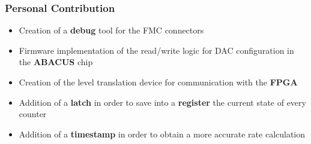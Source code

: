 \documentclass[aspectratio=169]{beamer}
\begin{document}
	
	\begin{frame}
	\frametitle{Personal Contribution}
	\begin{itemize}
		\item {\color{teal} Creation of a \textbf{debug} tool for the FMC connectors}
		\item {\color{teal} Firmware implementation of the read/write logic for DAC configuration in the \textbf{ABACUS} chip}
		\item {\color{teal} Creation of the level translation device for communication with the \textbf{FPGA}}
		\item {\color{red} Addition of a \textbf{latch} in order to save into a \textbf{register} the current state of every counter}
		\item {\color{red} Addition of a \textbf{timestamp} in order to obtain a more accurate rate calculation}
	\end{itemize}
	\end{frame}
	
\end{document}
